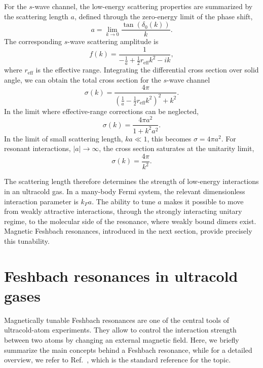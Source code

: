 For the $s$-wave channel, the low-energy scattering properties are summarized by the scattering length $a$, defined through the zero-energy limit of the phase shift,
\begin{equation}
	a=\lim_{k\to0}\frac{\tan(\delta_0(k))}{k}.
	\label{eq:ScatteringLength}
\end{equation}
The corresponding $s$-wave scattering amplitude is
\begin{equation}
	f(k)=\frac{1}{-\frac{1}{a}+\frac{1}{2}r_{\textrm{eff}}k^2-ik},
	\label{eq:ScatteringAmplswave}
\end{equation}
where $r_{\mathrm{eff}}$ is the effective range. Integrating the differential cross section over solid angle, we can obtain the total cross section for the $s$-wave channel
\begin{equation}
	\sigma(k)=\frac{4\pi}{\left(\frac{1}{a}-\frac{1}{2}r_{\textrm{eff}}k^2\right)^2+k^2}.
\end{equation}
In the limit where effective-range corrections can be neglected,
\begin{equation}
	\sigma(k)=\frac{4\pi a^2}{1+k^2a^2}.
	\label{eq:TotalCrossSection}
\end{equation}
In the limit of small scattering length, $ka\ll1$, this becomes $\sigma=4\pi a^2$. For resonant interactions, $|a|\to\infty$, the cross section saturates at the unitarity limit,
\begin{equation}
	\sigma(k)=	\frac{4\pi}{k^2}.
	\label{eq:UniversalCrossSec}
\end{equation}

The scattering length therefore determines the strength of low-energy interactions in an ultracold gas. In a many-body Fermi system, the relevant dimensionless interaction parameter is $k_Fa$. The ability to tune $a$ makes it possible to move from weakly attractive interactions, through the strongly interacting unitary regime, to the molecular side of the resonance, where weakly bound dimers exist. Magnetic Feshbach resonances, introduced in the next section, provide precisely this tunability. 

\section{Feshbach resonances in ultracold gases}
\label{sec:FeshbachResIntro}


Magnetically tunable Feshbach resonances are one of the central tools of ultracold-atom experiments. They allow to control the interaction strength between two atoms by changing an external magnetic field. Here, we briefly summarize the main concepts behind a Feshbach resonance, while for a detailed overview, we refer to Ref.~\cite{Chin2010fri}, which is the standard reference for the topic. 

